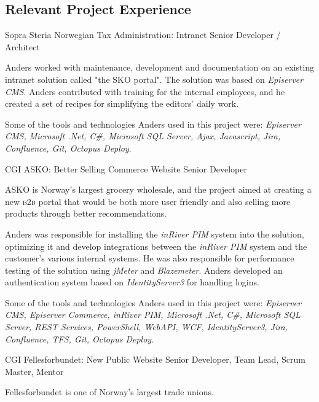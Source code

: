 \documentclass[10pt]{article} %
\begin{document}
\begin{paracol}{2}

\section{Relevant Project Experience}


{Sopra Steria} %
{Norwegian Tax Administration: Intranet} 
{Senior Developer / Architect} 
{Anders worked with maintenance, development and documentation on an existing intranet solution called "the SKO portal". The solution was based on \textit{Episerver CMS}. Anders contributed with training for the internal employees, and he created a set of recipes for simplifying the editors' daily work.

\qquad Some of the tools and technologies Anders used in this project were: \textit{Episerver CMS, Microsoft .Net, C\#, Microsoft SQL Server, Ajax, Javascript, Jira, Confluence, Git, Octopus Deploy}.} 

{CGI} %
{ASKO: Better Selling Commerce Website} 
{Senior Developer} 
{ASKO is Norway's largest grocery wholesale, and the project aimed at creating a new \textsc{b2b} portal that would be both more user friendly and also selling more products through better recommendations.

\qquad Anders was responsible for installing the \textit{inRiver PIM} system into the solution, optimizing it and develop integrations between the \textit{inRiver PIM} system and the customer's various internal systems. He was also responsible for performance testing of
the solution using \textit{jMeter} and \textit{Blazemeter}. Anders developed an authentication system based on \textit{IdentityServer3}
for handling logins.

\qquad Some of the tools and technologies Anders used in this project were: \textit{Episerver CMS, Episerver Commerce, inRiver PIM, Microsoft .Net, C\#, Microsoft SQL Server, REST Services, PowerShell, WebAPI, WCF, IdentityServer3, Jira, Confluence, TFS, Git, Octopus Deploy}.} 
\pagebreak


{CGI} 
{Fellesforbundet: New Public Website} 
{Senior Developer, Team Lead, Scrum Master, Mentor} 
{Fellesforbundet is one of Norway's largest trade unions.

}
\end{paracol}
\end{document}
